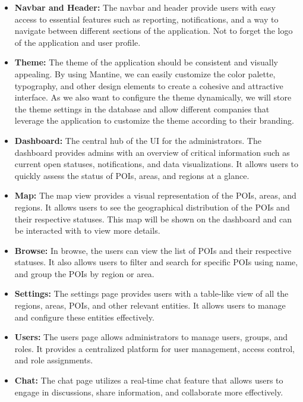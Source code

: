 \begin{itemize}
    \item \textbf{Navbar and Header:} The navbar and header provide users with easy access to essential features such as reporting, notifications, and a way to navigate between different sections of the application. Not to forget the logo of the application and user profile.
    \item \textbf{Theme:} The theme of the application should be consistent and visually appealing. By using Mantine, we can easily customize the color palette, typography, and other design elements to create a cohesive and attractive interface. As we also want to configure the theme dynamically, we will store the theme settings in the database and allow different companies that leverage the application to customize the theme according to their branding.
    \item \textbf{Dashboard:} The central hub of the UI for the administrators. The dashboard provides admins with an overview of critical information such as current open statuses, notifications, and data visualizations. It allows users to quickly assess the status of POIs, areas, and regions at a glance.
    \item \textbf{Map:} The map view provides a visual representation of the POIs, areas, and regions. It allows users to see the geographical distribution of the POIs and their respective statuses. This map will be shown on the dashboard and can be interacted with to view more details.
    \item \textbf{Browse:} In browse, the users can view the list of POIs and their respective statuses. It also allows users to filter and search for specific POIs using name, and group the POIs by region or area.
    \item \textbf{Settings:} The settings page provides users with a table-like view of all the regions, areas, POIs, and other relevant entities. It allows users to manage and configure these entities effectively.
    \item \textbf{Users:} The users page allows administrators to manage users, groups, and roles. It provides a centralized platform for user management, access control, and role assignments.
    \item \textbf{Chat:} The chat page utilizes a real-time chat feature that allows users to engage in discussions, share information, and collaborate more effectively.
   
\end{itemize}

